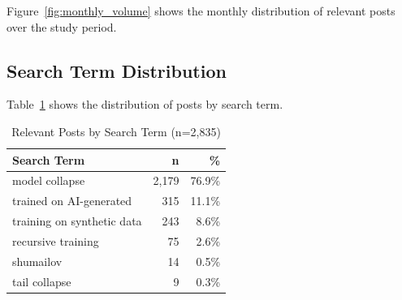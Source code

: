 \documentclass[11pt,preprint]{article}
\begin{document}
Figure~\ref{fig:monthly_volume} shows the monthly distribution of relevant posts over the study period.

\subsection{Search Term Distribution}

Table~\ref{tab:app_search_terms} shows the distribution of posts by search term.

\begin{table}[h]
\centering
\caption{Relevant Posts by Search Term (n=2,835)}
\label{tab:app_search_terms}
\begin{tabular}{lrr}
\toprule
\textbf{Search Term} & \textbf{n} & \textbf{\%} \\
\midrule
model collapse & 2,179 & 76.9\% \\
trained on AI-generated & 315 & 11.1\% \\
training on synthetic data & 243 & 8.6\% \\
recursive training & 75 & 2.6\% \\
shumailov & 14 & 0.5\% \\
tail collapse & 9 & 0.3\% \\
\bottomrule
\end{tabular}
\end{table}
\end{document}
